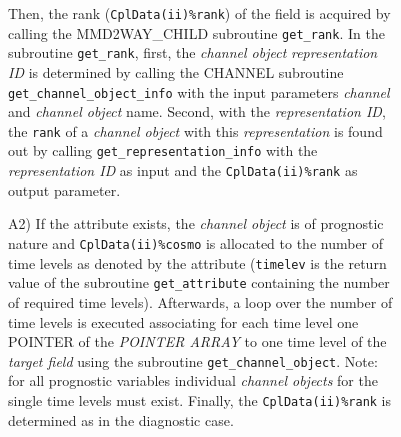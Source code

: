 \documentclass[11pt,twoside]{article}
\begin{document}
\begin{itemize}
\begin{enumerate}
\begin{itemize}
\begin{itemize}
\begin{itemize}
Then, the rank (\verb|CplData(ii)%rank|) of the field is acquired by calling the 
MMD2WAY\_CHILD subroutine \verb|get_rank|.
In the subroutine \verb|get_rank|, first, the {\it channel object} 
{\it representation ID}
is determined by calling the CHANNEL subroutine \verb|get_channel_object_info|
with the input parameters {\it channel} and {\it channel object} name. 
Second, with the {\it representation ID}, the \verb|rank| of a 
{\it channel object} with this {\it representation} is found out by calling 
\verb|get_representation_info| with the {\it representation ID}
 as input and the \verb|CplData(ii)%rank| as output parameter.

\item[A2)] If the attribute exists, the {\it channel object} is of prognostic
nature and \verb|CplData(ii)%cosmo| is allocated to the number of time levels as
 denoted
by the attribute (\verb|timelev| is the return value of the subroutine 
\verb|get_attribute| containing the number of required time levels).
Afterwards, a loop over the number of time levels is executed associating for
each time level one {\footnotesize POINTER} of the 
{\footnotesize \it POINTER ARRAY}
 to one time level of the {\it target field} using the subroutine 
\verb|get_channel_object|. 
Note: for all prognostic variables individual {\it channel objects} for the 
single time levels must exist. 
Finally, the \verb|CplData(ii)%rank| is determined as in the diagnostic case.


\end{itemize}
\end{itemize}
\end{itemize}
\end{enumerate}
\end{itemize}
\end{document}
